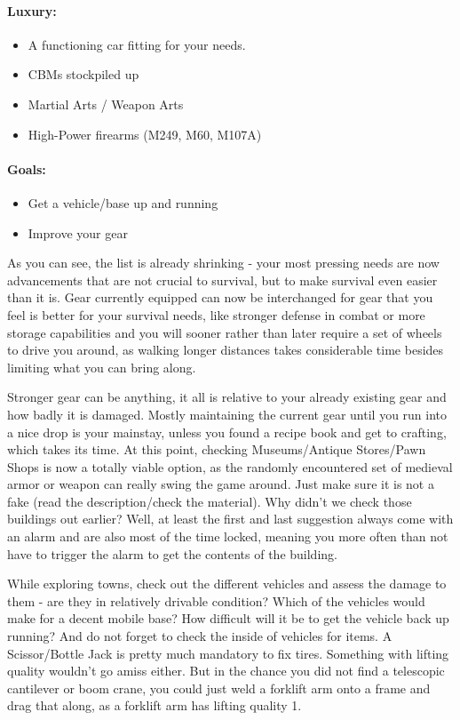 \paragraph{Luxury:}
\begin{itemize}
\item A functioning car fitting for your needs.
\item CBMs stockpiled up
\item Martial Arts / Weapon Arts
\item High-Power firearms (M249, M60, M107A)
\end{itemize}


\paragraph{Goals:}
\begin{itemize}
\item Get a vehicle/base up and running
\item Improve your gear
\end{itemize}

As you can see, the list is already shrinking - your most pressing needs are now advancements that are not crucial to survival, but to make survival even easier than it is. Gear currently equipped can now be interchanged for gear that you feel is better for your survival needs, like stronger defense in combat or more storage capabilities and you will sooner rather than later require a set of wheels to drive you around, as walking longer distances takes considerable time besides limiting what you can bring along.

Stronger gear can be anything, it all is relative to your already existing gear and how badly it is damaged. Mostly maintaining the current gear until you run into a nice drop is your mainstay, unless you found a recipe book and get to crafting, which takes its time. At this point, checking Museums/Antique Stores/Pawn Shops is now a totally viable option, as the randomly encountered set of medieval armor or weapon can really swing the game around. Just make sure it is not a fake (read the description/check the material). Why didn't we check those buildings out earlier? Well, at least the first and last suggestion always come with an alarm and are also most of the time locked, meaning you more often than not have to trigger the alarm to get the contents of the building.

While exploring towns, check out the different vehicles and assess the damage to them - are they in relatively drivable condition? Which of the vehicles would make for a decent mobile base? How difficult will it be to get the vehicle back up running? And do not forget to check the inside of vehicles for items. A Scissor/Bottle Jack is pretty much mandatory to fix tires. Something with lifting quality wouldn't go amiss either. But in the chance you did not find a telescopic cantilever or boom crane, you could just weld a forklift arm onto a frame and drag that along, as a forklift arm has lifting quality 1.

